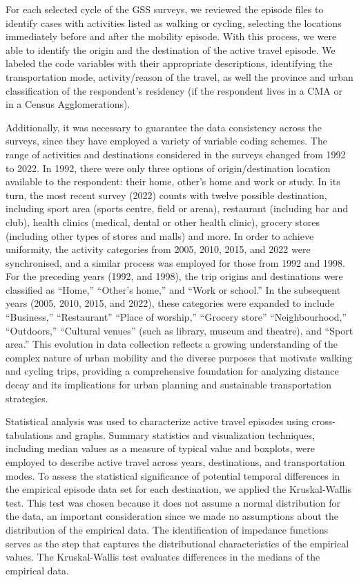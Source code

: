 \documentclass[preprint, 3p,
authoryear]{elsarticle} %
\begin{document}
For each selected cycle of the GSS surveys, we reviewed the episode
files to identify cases with activities listed as walking or cycling,
selecting the locations immediately before and after the mobility
episode. With this process, we were able to identify the origin and the
destination of the active travel episode. We labeled the code variables
with their appropriate descriptions, identifying the transportation
mode, activity/reason of the travel, as well the province and urban
classification of the respondent's residency (if the respondent lives in
a CMA or in a Census Agglomerations).

Additionally, it was necessary to guarantee the data consistency across
the surveys, since they have employed a variety of variable coding
schemes. The range of activities and destinations considered in the
surveys changed from 1992 to 2022. In 1992, there were only three
options of origin/destination location available to the respondent:
their home, other's home and work or study. In its turn, the most recent
survey (2022) counts with twelve possible destination, including sport
area (sports centre, field or arena), restaurant (including bar and
club), health clinics (medical, dental or other health clinic), grocery
stores (including other types of stores and malls) and more. In order to
achieve uniformity, the activity categories from 2005, 2010, 2015, and
2022 were synchronised, and a similar process was employed for those
from 1992 and 1998. For the preceding years (1992, and 1998), the trip
origins and destinations were classified as ``Home,'' ``Other's home,''
and ``Work or school.'' In the subsequent years (2005, 2010, 2015, and
2022), these categories were expanded to include ``Business,''
``Restaurant'' ``Place of worship,'' ``Grocery store''
``Neighbourhood,'' ``Outdoors,'' ``Cultural venues'' (such as library,
museum and theatre), and ``Sport area.'' This evolution in data
collection reflects a growing understanding of the complex nature of
urban mobility and the diverse purposes that motivate walking and
cycling trips, providing a comprehensive foundation for analyzing
distance decay and its implications for urban planning and sustainable
transportation strategies.

Statistical analysis was used to characterize active travel episodes
using cross-tabulations and graphs. Summary statistics and visualization
techniques, including median values as a measure of typical value and
boxplots, were employed to describe active travel across years,
destinations, and transportation modes. To assess the statistical
significance of potential temporal differences in the empirical episode
data set for each destination, we applied the Kruskal-Wallis test. This
test was chosen because it does not assume a normal distribution for the
data, an important consideration since we made no assumptions about the
distribution of the empirical data. The identification of impedance
functions serves as the step that captures the distributional
characteristics of the empirical values. The Kruskal-Wallis test
evaluates differences in the medians of the empirical data.
\end{document}
